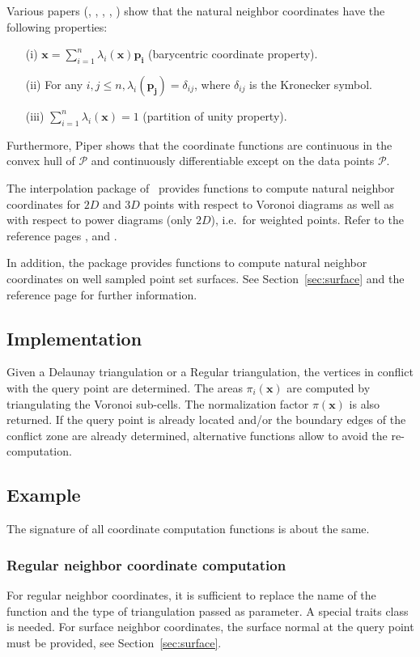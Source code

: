 Various papers (\cite{s-vidt-80}, \cite{f-sodt-90},
\cite{cgal:p-plcbd-93}, \cite{b-scaps-97}, \cite{hs-vbihc-00}) show that
the natural neighbor coordinates have the following properties:
  \begin{itemize}
  \item[(i)] $\mathbf{x} = \sum_{i=1}^n \lambda_i(\mathbf{x}) \mathbf{p_i}$
    (barycentric coordinate property).
  \item[(ii)] For any $i,j \leq n, \lambda_i(\mathbf{p_j})=
    \delta_{ij}$, where $\delta_{ij}$ is the Kronecker symbol.
  \item[(iii)] $\sum_{i=1}^n \lambda_i(\mathbf{x}) = 1$ (partition of unity
    property).
  \end{itemize}
  Furthermore, Piper \cite{cgal:p-plcbd-93} shows that the coordinate
  functions are continuous in the convex hull of $\mathcal{P}$ and
  continuously differentiable except on the data points $\mathcal{P}$.
  \medskip
  
  The interpolation package of \cgal\ provides functions to compute
  natural neighbor coordinates for $2D$ and $3D$ points with respect
  to Voronoi diagrams as well as with respect to power diagrams (only
  $2D$), i.e.\ for weighted points. Refer to the reference pages
  ,
   and
  .
  
  In addition, the package provides functions to compute natural
  neighbor coordinates on well sampled point set surfaces. See
  Section~\ref{sec:surface} and the reference page
   for further information.

\subsection{Implementation}
Given a Delaunay triangulation or a Regular triangulation, the
vertices in conflict with the query point are determined. The areas
$\pi_i(\mathbf{x})$ are computed by triangulating the Voronoi
sub-cells.  The normalization factor $\pi(\mathbf{x})$ is also
returned. If the query point is already located and/or the boundary
edges of the conflict zone are already determined, alternative
functions allow to avoid the re-computation.

\subsection{Example}
The signature of all coordinate computation functions is about the
same.
\subsubsection{Regular neighbor coordinate computation}
For regular neighbor coordinates, it is sufficient to replace the name
of the function and the type of triangulation passed as parameter. A
special traits class is needed.
For surface neighbor coordinates, the surface normal at the query
point must be provided, see Section~\ref{sec:surface}.
%
